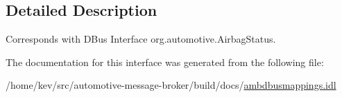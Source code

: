 \subsection{Detailed Description}
Corresponds with D\+Bus Interface org.\+automotive.\+Airbag\+Status. 

The documentation for this interface was generated from the following file\+:\begin{DoxyCompactItemize}
\item 
/home/kev/src/automotive-\/message-\/broker/build/docs/\hyperlink{ambdbusmappings_8idl}{ambdbusmappings.\+idl}\end{DoxyCompactItemize}

